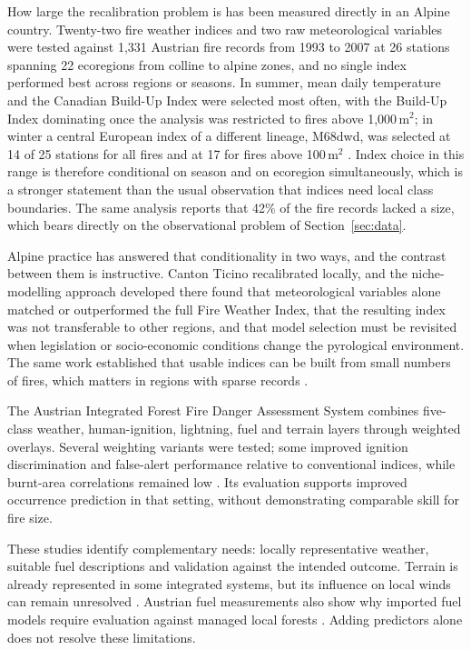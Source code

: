 \documentclass[11pt,a4paper]{article}
\begin{document}
How large the recalibration problem is has been measured directly in an Alpine country. Twenty-two fire weather indices and two raw meteorological variables were tested against 1{,}331 Austrian fire records from 1993 to 2007 at 26 stations spanning 22 ecoregions from colline to alpine zones, and no single index performed best across regions or seasons. In summer, mean daily temperature and the Canadian Build-Up Index were selected most often, with the Build-Up Index dominating once the analysis was restricted to fires above 1{,}000\,m$^2$; in winter a central European index of a different lineage, M68dwd, was selected at 14 of 25 stations for all fires and at 17 for fires above 100\,m$^2$ \citep{arpaci_selecting_2013}. Index choice in this range is therefore conditional on season and on ecoregion simultaneously, which is a stronger statement than the usual observation that indices need local class boundaries. The same analysis reports that 42\% of the fire records lacked a size, which bears directly on the observational problem of Section~\ref{sec:data}.

Alpine practice has answered that conditionality in two ways, and the contrast between them is instructive. Canton Ticino recalibrated locally, and the niche-modelling approach developed there found that meteorological variables alone matched or outperformed the full Fire Weather Index, that the resulting index was not transferable to other regions, and that model selection must be revisited when legislation or socio-economic conditions change the pyrological environment. The same work established that usable indices can be built from small numbers of fires, which matters in regions with sparse records \citep{de_angelis_modelling_2015}.

The Austrian Integrated Forest Fire Danger Assessment System combines five-class weather, human-ignition, lightning, fuel and terrain layers through weighted overlays. Several weighting variants were tested; some improved ignition discrimination and false-alert performance relative to conventional indices, while burnt-area correlations remained low \citep{muller_towards_2020}. Its evaluation supports improved occurrence prediction in that setting, without demonstrating comparable skill for fire size.

These studies identify complementary needs: locally representative weather, suitable fuel descriptions and validation against the intended outcome. Terrain is already represented in some integrated systems, but its influence on local winds can remain unresolved \citep{perello_fuelaware_2025, ozaki_impact_2022}. Austrian fuel measurements also show why imported fuel models require evaluation against managed local forests \citep{neumann_fuel_2022}. Adding predictors alone does not resolve these limitations.
\end{document}
